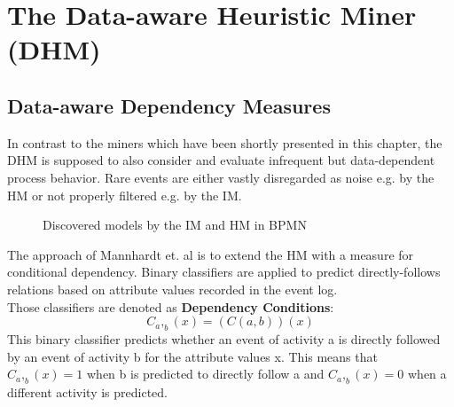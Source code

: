 \section{The Data-aware Heuristic Miner (DHM)}
\subsection{Data-aware Dependency Measures}
In contrast to the miners which have been shortly presented in this chapter, the DHM is supposed to also consider and evaluate infrequent but data-dependent process behavior. Rare events are either vastly disregarded as noise e.g. by the HM or not properly filtered e.g. by the IM.
\begin{figure} [H]
\caption{Discovered models by the IM and HM in BPMN \protect\cite{Mannhardt17}}
\end{figure}

\noindent The approach of Mannhardt et. al is to extend the HM with a measure for conditional dependency. Binary classifiers are applied to predict directly-follows relations based on attribute values recorded in the event log.\\ 
\noindent Those classifiers are denoted as \textbf{Dependency Conditions}:
\[C_a,_b(x) = (C(a, b))(x)\]
This binary classifier predicts whether an event of activity a is directly followed by an event of activity b for the attribute values x. This means that $C_a,_b(x) = 1$ when b is predicted to directly follow a and $C_a,_b(x) = 0$ when a different activity is predicted.\\


